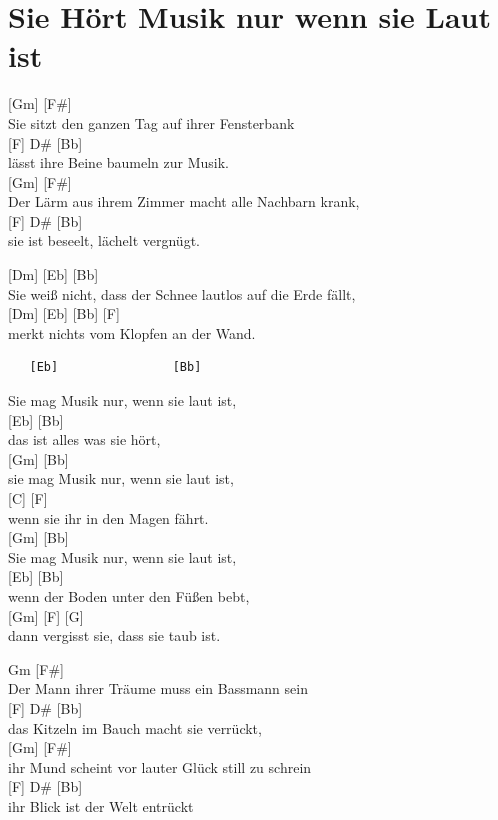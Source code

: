 \documentclass[
  letterpaper,
]{scrbook}
\begin{document}
\hypertarget{sie-huxf6rt-musik-nur-wenn-sie-laut-ist}{%
\chapter{Sie Hört Musik nur wenn sie Laut
ist}\label{sie-huxf6rt-musik-nur-wenn-sie-laut-ist}}

{[}Gm{]} {[}F\#{]}\\
Sie sitzt den ganzen Tag auf ihrer Fensterbank\\
{[}F{]} D\# {[}Bb{]}\\
lässt ihre Beine baumeln zur Musik.\\
{[}Gm{]} {[}F\#{]}\\
Der Lärm aus ihrem Zimmer macht alle Nachbarn krank,\\
{[}F{]} D\# {[}Bb{]}\\
sie ist beseelt, lächelt vergnügt.

{[}Dm{]} {[}Eb{]} {[}Bb{]}\\
Sie weiß nicht, dass der Schnee lautlos auf die Erde fällt,\\
{[}Dm{]} {[}Eb{]} {[}Bb{]} {[}F{]}\\
merkt nichts vom Klopfen an der Wand.

\begin{verbatim}
   [Eb]                [Bb]
\end{verbatim}

Sie mag Musik nur, wenn sie laut ist,\\
{[}Eb{]} {[}Bb{]}\\
das ist alles was sie hört,\\
{[}Gm{]} {[}Bb{]}\\
sie mag Musik nur, wenn sie laut ist,\\
{[}C{]} {[}F{]}\\
wenn sie ihr in den Magen fährt.\\
{[}Gm{]} {[}Bb{]}\\
Sie mag Musik nur, wenn sie laut ist,\\
{[}Eb{]} {[}Bb{]}\\
wenn der Boden unter den Füßen bebt,\\
{[}Gm{]} {[}F{]} {[}G{]}\\
dann vergisst sie, dass sie taub ist.

Gm {[}F\#{]}\\
Der Mann ihrer Träume muss ein Bassmann sein\\
{[}F{]} D\# {[}Bb{]}\\
das Kitzeln im Bauch macht sie verrückt,\\
{[}Gm{]} {[}F\#{]}\\
ihr Mund scheint vor lauter Glück still zu schrei\textquotesingle n\\
{[}F{]} D\# {[}Bb{]}\\
ihr Blick ist der Welt entrückt
\end{document}
